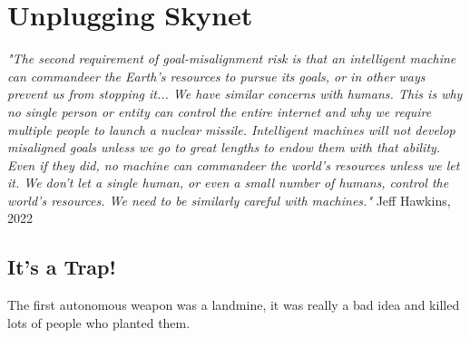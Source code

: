 \setchapterpreamble[u]{\margintoc}
\chapter{Unplugging Skynet}

\textit{"The second requirement of goal-misalignment risk is that an intelligent machine can commandeer the Earth's resources to pursue its goals, or in other ways prevent us from stopping it... We have similar concerns with humans. This is why no single person or entity can control the entire internet and why we require multiple people to launch a nuclear missile. Intelligent machines will not develop misaligned goals unless we go to great lengths to endow them with that ability. Even if they did, no machine can commandeer the world's resources unless we let it. We don't let a single human, or even a small number of humans, control the world's resources. We need to be similarly careful with machines."} Jeff Hawkins, 2022 \cite{hawkins2022}

\section{It's a Trap!}

The first autonomous weapon was a landmine, it was really a bad idea and killed lots of people who planted them.

